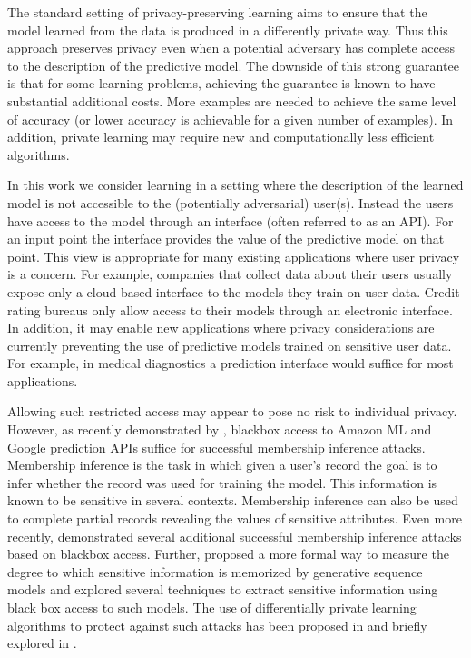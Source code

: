 \documentclass[final,12pt]{colt2018}
\begin{document}
The standard setting of privacy-preserving learning aims to ensure that the model learned from the data is produced in a differently private way. Thus this approach preserves privacy even when a potential adversary has complete access to the description of the predictive model. The downside of this strong guarantee is that for some learning problems, achieving the guarantee is known to have substantial additional costs. More examples are needed to achieve the same level of accuracy (or lower accuracy is achievable for a given number of examples). In addition, private learning may require new and computationally less efficient algorithms.

In this work we consider learning in a setting where the description of the learned model is not accessible to the (potentially adversarial) user(s). Instead the users have access to the model through an interface (often referred to as an API). For an input point the interface provides the value of the predictive model on that point. This view is appropriate for many existing applications where user privacy is a concern. For example, companies that collect data about their users usually expose only a cloud-based interface to the models they train on user data. Credit rating bureaus only allow access to their models through an electronic interface. In addition, it may enable new applications where privacy considerations are currently preventing the use of predictive models trained on sensitive user data. For example, in medical diagnostics a prediction interface would suffice for most applications.

Allowing such restricted access may appear to pose no risk to individual privacy. However, as recently demonstrated by \citet{ShokriSSS17}, blackbox access to Amazon ML and Google prediction APIs suffice for successful membership inference attacks. Membership inference is the task in which given a user's record the goal is to infer whether the record was used for training the model. This information is known to be sensitive in several contexts. Membership inference can also be used to complete partial records revealing the values of sensitive attributes. Even more recently, \citet{LongBWBW18} demonstrated several additional successful membership inference attacks based on blackbox access. Further, \citet{CarliniLKES18} proposed a more formal way to measure the degree to which sensitive information is memorized by generative sequence models and explored several techniques to extract sensitive information using black box access to such models. The use of differentially private learning algorithms to protect against such attacks has been proposed in \citep{ShokriSSS17} and briefly explored in \citep{CarliniLKES18}.
\end{document}
